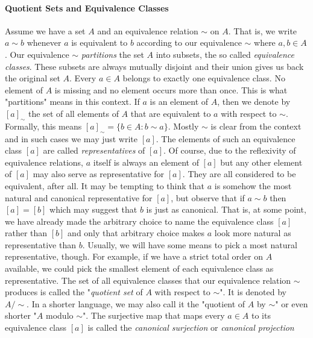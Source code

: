 \paragraph{Quotient Sets and Equivalence Classes} 
Assume we have a set $A$ and an equivalence relation $\sim$ on $A$. That is, we write $a \sim b$ whenever $a$ is equivalent to $b$ according to our equivalence $\sim$ where $a,b \in A$. Our equivalence $\sim$ \emph{partitions} the set $A$ into subsets, the so called \emph{equivalence classes}. These subsets are always mutually disjoint and their union gives us back the original set $A$. Every $a \in A$ belongs to exactly one equivalence class. No element of $A$ is missing and no element occurs more than once. This is what "partitions" means in this context. If $a$ is an element of $A$, then we denote by $[a]_{\sim}$ the set of all elements of $A$ that are equivalent to $a$ with respect to $\sim$. Formally, this means $[a]_{\sim} = \{ b \in A : b \sim a\}$. Mostly $\sim$ is clear from the context and in such cases we may just write $[a]$. The elements of such an equivalence class $[a]$ are called \emph{representatives} of $[a]$. Of course, due to the reflexivity of equivalence relations, $a$ itself is always an element of $[a]$ but any other element of $[a]$ may also serve as representative for $[a]$. They are all considered to be equivalent, after all. It may be tempting to think that $a$ is somehow the most natural and canonical representative for $[a]$, but observe that if $a \sim b$ then $[a] = [b]$ which may suggest that $b$ is just as canonical. That is, at some point, we have already made the arbitrary choice to name the equivalence class $[a]$ rather than $[b]$ and only that arbitrary choice makes $a$ look more natural as representative than $b$. Usually, we will have some means to pick a most natural representative, though. For example, if we have a strict total order on $A$ available, we could pick the smallest element of each equivalence class as representative. The set of all equivalence classes that our equivalence relation $\sim$ produces is called the "\emph{quotient set} of $A$ with respect to $\sim$". It is denoted by $A / \sim$. In a shorter language, we may also call it the "quotient of $A$ by $\sim$" or even shorter "$A$ modulo $\sim$". The surjective map that maps every $a \in A$ to its equivalence class $[a]$ is called the \emph{canonical surjection} or \emph{canonical projection}



